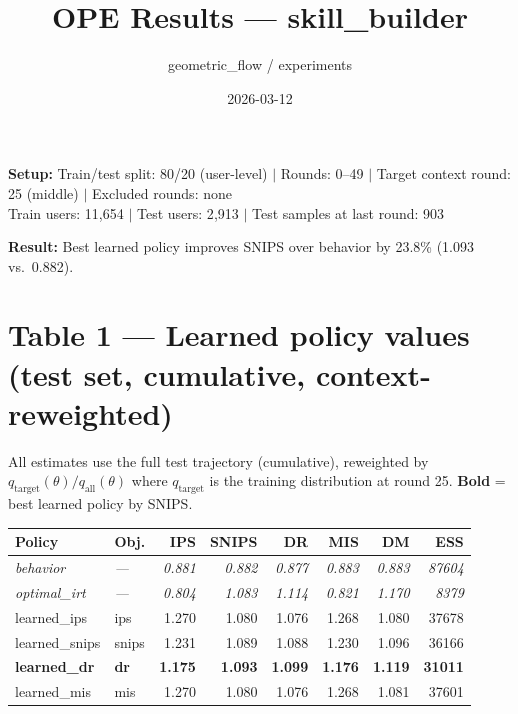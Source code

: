 \documentclass[11pt]{article}
\title{\textbf{OPE Results --- skill\_builder}}
\date{2026-03-12}
\author{geometric\_flow / experiments}
\begin{document}
\maketitle

\noindent\textbf{Setup:}
Train/test split: 80/20 (user-level) $|$
Rounds: 0--49 $|$
Target context round: 25 (middle) $|$
Excluded rounds: none\\
Train users: 11{,}654 $|$ Test users: 2{,}913 $|$ Test samples at last round: 903

\bigskip
\noindent\colorbox{goodbg}{\parbox{0.97\textwidth}{%
\textbf{Result:} Best learned policy improves SNIPS over behavior by 23.8\% (1.093 vs.\ 0.882).}}

\section*{Table 1 — Learned policy values (test set, cumulative, context-reweighted)}

{\small All estimates use the full test trajectory (cumulative), reweighted by
$q_{\text{target}}(\theta) / q_{\text{all}}(\theta)$ where $q_{\text{target}}$ is the
training distribution at round 25. \textbf{Bold} = best learned policy by SNIPS.}

\bigskip
\begin{tabular}{llrrrrrr}
\toprule
\textbf{Policy} & \textbf{Obj.} & \textbf{IPS} & \textbf{SNIPS} & \textbf{DR} & \textbf{MIS} & \textbf{DM} & \textbf{ESS} \\
\midrule
\rowcolor{behbg}
\textit{behavior} & \textit{---} & \textit{0.881} & \textit{0.882} & \textit{0.877} & \textit{0.883} & \textit{0.883} & \textit{87604} \\
\rowcolor{oraclebg}
\textit{optimal\_irt} & \textit{---} & \textit{0.804} & \textit{1.083} & \textit{1.114} & \textit{0.821} & \textit{1.170} & \textit{8379} \\
learned\_ips & ips & 1.270 & 1.080 & 1.076 & 1.268 & 1.080 & 37678 \\
learned\_snips & snips & 1.231 & 1.089 & 1.088 & 1.230 & 1.096 & 36166 \\
\textbf{learned\_dr} & \textbf{dr} & \textbf{1.175} & \textbf{1.093} & \textbf{1.099} & \textbf{1.176} & \textbf{1.119} & \textbf{31011} \\
learned\_mis & mis & 1.270 & 1.080 & 1.076 & 1.268 & 1.081 & 37601 \\
\bottomrule
\end{tabular}
\end{document}
